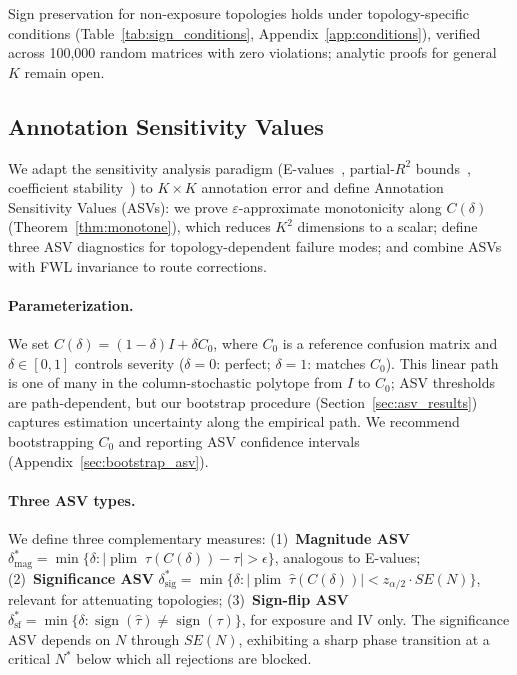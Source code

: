 Sign preservation for non-exposure topologies holds under topology-specific conditions (Table~\ref{tab:sign_conditions}, Appendix~\ref{app:conditions}), verified across 100{,}000 random matrices with zero violations; analytic proofs for general $K$ remain open.

\subsection{Annotation Sensitivity Values}
\label{sec:asv}

We adapt the sensitivity analysis paradigm (E-values~\cite{vanderweele_ding2017}, partial-$R^2$ bounds~\cite{cinelli2020making}, coefficient stability~\cite{oster2019}) to $K{\times}K$ annotation error and define Annotation Sensitivity Values (ASVs): we prove $\varepsilon$-approximate monotonicity along $C(\delta)$ (Theorem~\ref{thm:monotone}), which reduces $K^2$ dimensions to a scalar; define three ASV diagnostics for topology-dependent failure modes; and combine ASVs with FWL invariance to route corrections.

\paragraph{Parameterization.}
We set $C(\delta) = (1{-}\delta)I + \delta C_0$, where $C_0$ is a reference confusion matrix and $\delta \in [0,1]$ controls severity ($\delta{=}0$: perfect; $\delta{=}1$: matches $C_0$). This linear path is one of many in the column-stochastic polytope from $I$ to $C_0$; ASV thresholds are path-dependent, but our bootstrap procedure (Section~\ref{sec:asv_results}) captures estimation uncertainty along the empirical path. We recommend bootstrapping $C_0$ and reporting ASV confidence intervals (Appendix~\ref{sec:bootstrap_asv}).
\paragraph{Three ASV types.}
We define three complementary measures: (1)~\textbf{Magnitude ASV} $\delta^*_{\text{mag}} = \min\{\delta : |\operatorname{plim}\;\hat{\tau}(C(\delta)) - \tau| > \epsilon\}$, analogous to E-values; (2)~\textbf{Significance ASV} $\delta^*_{\text{sig}} = \min\{\delta : |\operatorname{plim}\;\hat{\tau}(C(\delta))| < z_{\alpha/2} \cdot SE(N)\}$, relevant for attenuating topologies; (3)~\textbf{Sign-flip ASV} $\delta^*_{\text{sf}} = \min\{\delta : \operatorname{sign}(\hat{\tau}) \neq \operatorname{sign}(\tau)\}$, for exposure and IV only. The significance ASV depends on $N$ through $SE(N)$, exhibiting a sharp phase transition at a critical $N^*$ below which all rejections are blocked.

